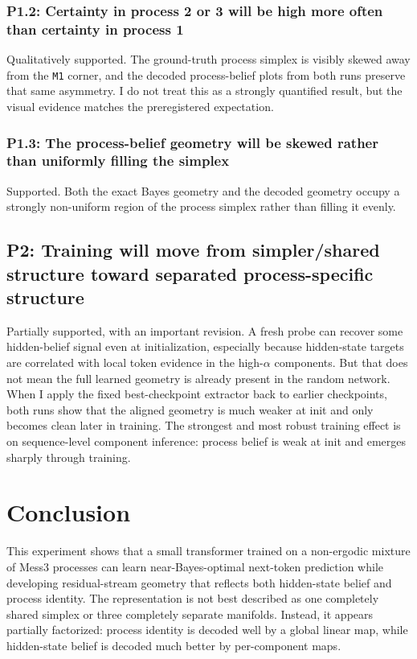 \documentclass[11pt]{article}
\begin{document}
\subsubsection*{P1.2: Certainty in process 2 or 3 will be high more often than certainty in process 1}

Qualitatively supported. The ground-truth process simplex is visibly skewed away from the \texttt{M1} corner, and the decoded process-belief plots from both runs preserve that same asymmetry. I do not treat this as a strongly quantified result, but the visual evidence matches the preregistered expectation.

\subsubsection*{P1.3: The process-belief geometry will be skewed rather than uniformly filling the simplex}

Supported. Both the exact Bayes geometry and the decoded geometry occupy a strongly non-uniform region of the process simplex rather than filling it evenly.

\subsection{P2: Training will move from simpler/shared structure toward separated process-specific structure}

Partially supported, with an important revision. A fresh probe can recover some hidden-belief signal even at initialization, especially because hidden-state targets are correlated with local token evidence in the high-$\alpha$ components. But that does not mean the full learned geometry is already present in the random network. When I apply the fixed best-checkpoint extractor back to earlier checkpoints, both runs show that the aligned geometry is much weaker at init and only becomes clean later in training. The strongest and most robust training effect is on sequence-level component inference: process belief is weak at init and emerges sharply through training.

\section{Conclusion}

This experiment shows that a small transformer trained on a non-ergodic mixture of Mess3 processes can learn near-Bayes-optimal next-token prediction while developing residual-stream geometry that reflects both hidden-state belief and process identity. The representation is not best described as one completely shared simplex or three completely separate manifolds. Instead, it appears partially factorized: process identity is decoded well by a global linear map, while hidden-state belief is decoded much better by per-component maps.
\end{document}
